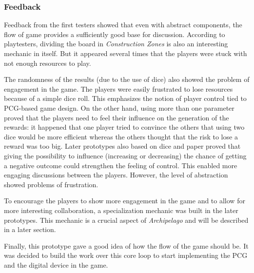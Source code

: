 \subsubsection{Feedback}
Feedback from the first testers showed that even with abstract components, the flow of game provides a sufficiently good base for discussion. According to playtesters, dividing the board in \textit{Construction Zones} is also an interesting mechanic in itself. But it appeared several times that the players were stuck with not enough resources to play.

The randomness of the results (due to the use of dice) also showed the problem of engagement in the game. The players were easily frustrated to lose resources because of a simple dice roll. This emphasizes the notion of player control tied to PCG-based game design. On the other hand, using more than one parameter proved that the players need to feel their influence on the generation of the rewards: it happened that one player tried to convince the others that using two dice would be more efficient whereas the others thought that the risk to lose a reward was too big. Later prototypes also based on dice and paper proved that giving the possibility to influence (increasing or decreasing) the chance of getting a negative outcome could strengthen the feeling of control. This enabled more engaging discussions between the players. However, the level of abstraction showed problems of frustration.


To encourage the players to show more engagement in the game and to allow for more interesting collaboration, a specialization mechanic was built in the later prototypes. This mechanic is a crucial aspect of \textit{Archipelago} and will be described in a later section. 
 
Finally, this prototype gave a good idea of how the flow of the game should be. It was decided to build the work over this core loop to start implementing the PCG and the digital device in the game.\\\\


